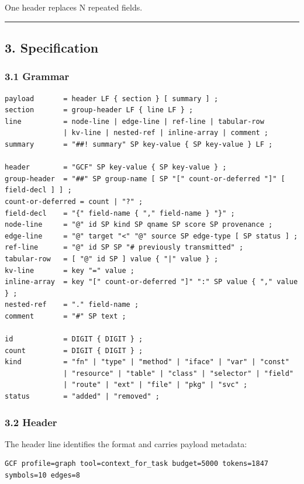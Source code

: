 \documentclass[
  11pt,
  paper=a4,
  ,captions=tableheading
]{scrartcl}
\begin{document}
One header replaces N repeated fields.

\begin{center}\rule{0.5\linewidth}{0.5pt}\end{center}

\subsection{3. Specification}\label{specification}

\subsubsection{3.1 Grammar}\label{grammar}

\begin{verbatim}
payload       = header LF { section } [ summary ] ;
section       = group-header LF { line LF } ;
line          = node-line | edge-line | ref-line | tabular-row
              | kv-line | nested-ref | inline-array | comment ;
summary       = "##! summary" SP key-value { SP key-value } LF ;

header        = "GCF" SP key-value { SP key-value } ;
group-header  = "##" SP group-name [ SP "[" count-or-deferred "]" [ field-decl ] ] ;
count-or-deferred = count | "?" ;
field-decl    = "{" field-name { "," field-name } "}" ;
node-line     = "@" id SP kind SP qname SP score SP provenance ;
edge-line     = "@" target "<" "@" source SP edge-type [ SP status ] ;
ref-line      = "@" id SP SP "# previously transmitted" ;
tabular-row   = [ "@" id SP ] value { "|" value } ;
kv-line       = key "=" value ;
inline-array  = key "[" count-or-deferred "]" ":" SP value { "," value } ;
nested-ref    = "." field-name ;
comment       = "#" SP text ;

id            = DIGIT { DIGIT } ;
count         = DIGIT { DIGIT } ;
kind          = "fn" | "type" | "method" | "iface" | "var" | "const"
              | "resource" | "table" | "class" | "selector" | "field"
              | "route" | "ext" | "file" | "pkg" | "svc" ;
status        = "added" | "removed" ;
\end{verbatim}

\subsubsection{3.2 Header}\label{header}

The header line identifies the format and carries payload metadata:

\begin{verbatim}
GCF profile=graph tool=context_for_task budget=5000 tokens=1847 symbols=10 edges=8
\end{verbatim}
\end{document}
